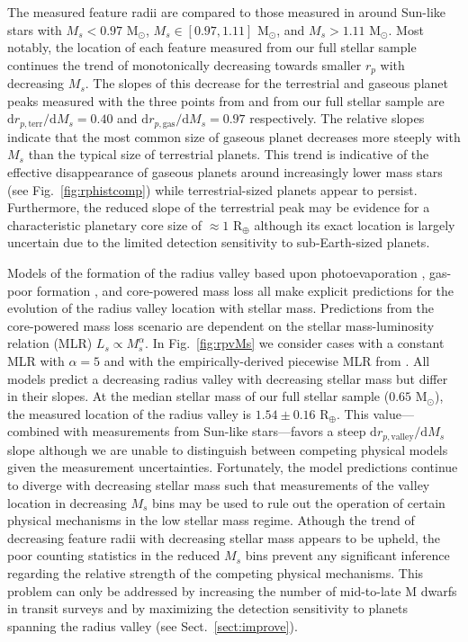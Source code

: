 \documentclass[twocolumn]{emulateapj}
\begin{document}
The measured feature radii are compared to those measured in \cite{fulton18} around Sun-like stars with
$M_s <0.97$ M$_{\odot}$, $M_s \in [0.97,1.11]$ M$_{\odot}$, and $M_s >1.11$ M$_{\odot}$.
Most notably, the location of each feature measured from our full stellar sample continues the trend of monotonically
decreasing towards smaller $r_p$ with decreasing $M_s$. The slopes of this decrease for the terrestrial and gaseous
planet peaks measured with the three points from \cite{fulton18} and from our full stellar sample
are $\text{d}r_{p,\text{terr}} / \text{d}M_s = 0.40$ and $\text{d}r_{p,\text{gas}} / \text{d}M_s = 0.97$
respectively. The relative slopes indicate that the most common size of
gaseous planet decreases more steeply with $M_s$ than the typical size of terrestrial planets. This trend
is indicative of the effective disappearance of gaseous planets around increasingly lower mass stars
(see Fig.~\ref{fig:rphistcomp}) while terrestrial-sized planets appear to persist.
Furthermore, the reduced slope of the terrestrial peak may be evidence for
a characteristic planetary core size of $\approx 1$ R$_{\oplus}$ although its exact location is largely uncertain
due to the limited detection sensitivity to sub-Earth-sized planets.   

Models of the formation of the radius valley based upon photoevaporation \citep{wu19}, gas-poor formation \citep{lopez18},
and core-powered mass loss \citep{gupta19b} all make explicit predictions for the evolution of the radius valley location
with stellar mass. Predictions from the core-powered mass loss scenario are dependent on the stellar mass-luminosity
relation (MLR) $L_s \propto M_s^{\alpha}$. In Fig.~\ref{fig:rpvMs} we consider cases with a constant MLR with $\alpha=5$
\citep{gupta19b} and with the empirically-derived piecewise MLR from \cite{eker18}. All models predict a decreasing
radius valley with decreasing stellar mass but differ in their slopes. 
At the median stellar mass of our full stellar sample ($0.65$ M$_{\odot}$), the measured location of the radius valley is
$1.54\pm 0.16$ R$_{\oplus}$. This value---combined with measurements from Sun-like stars---favors
a steep $\text{d}r_{p,\text{valley}} / \text{d}M_s$ slope although we are
unable to distinguish between competing physical models given the measurement uncertainties.
Fortunately, the model predictions continue to diverge
with decreasing stellar mass such that measurements of the valley location in decreasing $M_s$ bins may be used to
rule out the operation of certain physical mechanisms in the low stellar mass regime. Athough the trend of decreasing
feature radii with decreasing stellar mass appears to be upheld, the poor counting statistics in the reduced
$M_s$ bins prevent any significant inference regarding the relative strength of the competing physical mechanisms.
This problem can only be addressed by increasing the number of mid-to-late M dwarfs in transit surveys and by maximizing
the detection sensitivity to planets spanning the radius valley (see Sect.~\ref{sect:improve}).
\end{document}
